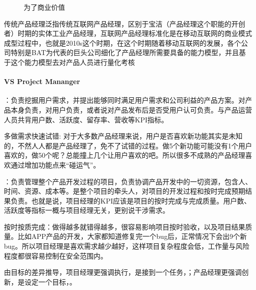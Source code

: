 \documentclass[letterpaper,11pt,english]{sphinxmanual}
\begin{document}
\begin{figure}[H]
\centering
\capstart

\noindent{}
\caption{为了商业价值}\label{\detokenize{chapter_introduction/PM:id29}}\end{figure}

传统产品经理泛指传统互联网产品经理，区别于宝洁（产品经理这个职能的开创者）时期的实体工业产品经理，互联网产品经理标准化是在移动互联网的商业模式成型过程中，也就是2010s这个时期，在这个时期随着移动互联网的发展，各个公司特别是BAT为代表的巨头公司细化了产品经理所需要具备的能力模型，并且基于这个能力模型去对产品人员进行量化考核
%
\begin{footnote}[52]\sphinxAtStartFootnote
{}
%
\end{footnote}


\paragraph{VS Project Mananger}
\label{\detokenize{chapter_introduction/PM:vs-project-mananger}}
：负责挖掘用户需求，并提出能够同时满足用户需求和公司利益的产品方案。对产品本身负责，对用户负责，或者说对产品发布后是否受用户认可负责。与产品运营人员共背用户数、活跃度、留存率、营收等KPI指标。

多做需求快速试错:
对于大多数产品经理来说，用户是否喜欢新功能其实是未知的，不然人人都是产品经理了，免不了试错的过程。做5个新功能可能没有1个用户喜欢的，做50个呢？总能撞上几个让用户喜欢的吧。所以很多不成熟的产品经理喜欢通过增加功能点来“碰运气”。

：负责管理整个产品开发过程的项目，负责协调产品开发中的一切资源，包含人、时间、资源、成本等。是整个项目的牵头人，对项目的开发过程和按时完成预期结果负责。也就是说，项目经理的KPI应该是项目的按时完成与完成质量。用户数、活跃度等指标一概与项目经理无关，更别说干涉需求。

按时按质完成：做得越多就错得越多，很容易影响项目按时验收，以及项目结果质量。比如APP产品的开发，大家都知道修复完一个bug后，正常情况下会出9个新bug。所以项目经理是喜欢需求越少越好，这样项目复杂程度会低，工作量与风险程度都很容易控制在安全范围内。

由目标的差异推导，项目经理更强调执行，是接到一个任务，；产品经理更强调创新，是设定一个目标，。
\end{document}
